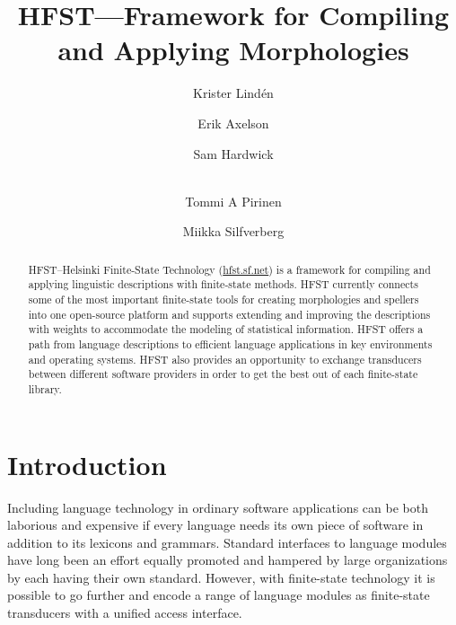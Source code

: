 \documentclass{llncs}
\begin{document}
%
\title{HFST---Framework for Compiling and Applying Morphologies}
%
\author{Krister Lind\'{e}n \and Erik Axelson \and Sam Hardwick \and\\
Tommi A Pirinen \and Miikka Silfverberg}


\maketitle


\begin{abstract}
\sloppy HFST--Helsinki Finite-State Technology (\url{hfst.sf.net})
is a framework for compiling and applying linguistic descriptions with
finite-state methods. 
HFST currently connects some of the most important finite-state tools for creating
morphologies and spellers into one open-source platform and supports
extending and improving the descriptions with weights to accommodate the modeling of
statistical information.
HFST offers a path from language descriptions to efficient language applications 
in key environments and operating systems. 
HFST also provides an opportunity to exchange transducers between 
different software providers in order to get the best out of each finite-state library. 
\end{abstract}


\section*{Introduction}
Including language technology in ordinary software applications can be
both laborious and expensive if every language needs its own piece of software
in addition to its lexicons and grammars. Standard interfaces
to language modules have long been an effort equally promoted and hampered 
by large organizations by each having their own standard.
However, with finite-state technology it is possible to go further and encode 
a range of language modules as finite-state transducers with a unified
access interface.
\end{document}
